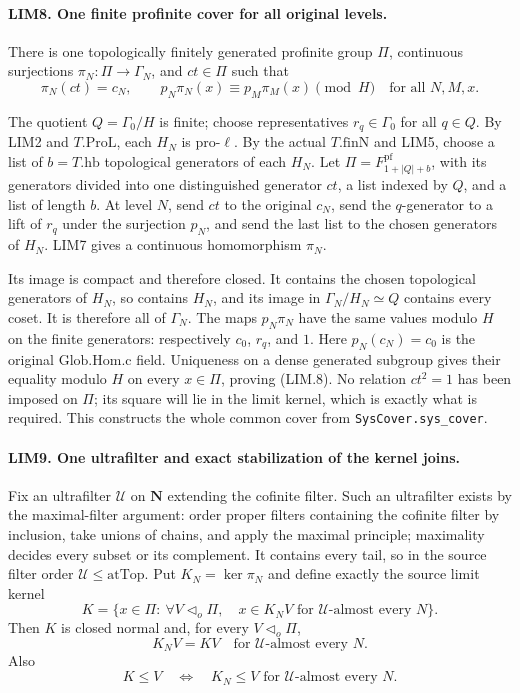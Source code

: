 \paragraph{LIM8. One finite profinite cover for all original levels.}
\label{claim:LIM8}
There is one topologically finitely generated profinite group \(\Pi\),
continuous surjections \(\pi_N:\Pi\to\Gamma_N\), and \(ct\in\Pi\)
such that
\[
 \pi_N(ct)=c_N,\qquad
 p_N\pi_N(x)\equiv p_M\pi_M(x)\pmod H
 \quad\text{for all }N,M,x.
 \tag{LIM.8}
\]

The quotient \(Q=\Gamma_0/H\) is finite; choose representatives
\(r_q\in\Gamma_0\) for all \(q\in Q\).
By LIM2 and \(T.\mathrm{ProL}\), each \(H_N\) is pro-\(\ell\).
By the actual \(T.\mathrm{finN}\) and LIM5, choose a list of
\(b=T.\mathrm{hb}\) topological generators of each \(H_N\).
Let \(\Pi=F_{1+|Q|+b}^{\mathrm{pf}}\), with its generators divided
into one distinguished generator \(ct\), a list indexed by \(Q\),
and a list of length \(b\).
At level \(N\), send \(ct\) to the original \(c_N\), send the
\(q\)-generator to a lift of \(r_q\) under the surjection \(p_N\),
and send the last list to the chosen generators of \(H_N\).
LIM7 gives a continuous homomorphism \(\pi_N\).

Its image is compact and therefore closed.  It contains the chosen
topological generators of \(H_N\), so contains \(H_N\), and its
image in \(\Gamma_N/H_N\simeq Q\) contains every coset.
It is therefore all of \(\Gamma_N\).
The maps \(p_N\pi_N\) have the same values modulo \(H\) on the
finite generators: respectively \(c_0\), \(r_q\), and \(1\).
Here \(p_N(c_N)=c_0\) is the original \(\mathrm{Glob.Hom.c}\) field.
Uniqueness on a dense generated subgroup gives their equality modulo
\(H\) on every \(x\in\Pi\), proving (LIM.8).
No relation \(ct^2=1\) has been imposed on \(\Pi\); its square
will lie in the limit kernel, which is exactly what is required.
This constructs the whole common cover from \texttt{SysCover.sys\_cover}.

\paragraph{LIM9. One ultrafilter and exact stabilization of the kernel joins.}
\label{claim:LIM9}
Fix an ultrafilter \(\mathcal U\) on \(\mathbf N\) extending the
cofinite filter.  Such an ultrafilter exists by the maximal-filter
argument: order proper filters containing the cofinite filter by
inclusion, take unions of chains, and apply the maximal principle;
maximality decides every subset or its complement.
It contains every tail, so in the source filter order
\(\mathcal U\le\mathrm{atTop}\).
Put \(K_N=\ker\pi_N\) and define exactly the source limit kernel
\[
 K=\{x\in\Pi:\ 
       \forall V\triangleleft_o\Pi,\quad
       x\in K_NV\text{ for }\mathcal U\text{-almost every }N\}.
 \tag{LIM.9}
\]
Then \(K\) is closed normal and, for every \(V\triangleleft_o\Pi\),
\[
 K_NV=KV\quad\text{for }\mathcal U\text{-almost every }N.
 \tag{LIM.10}
\]
Also
\[
 K\le V\quad\Longleftrightarrow\quad
 K_N\le V\text{ for }\mathcal U\text{-almost every }N.
 \tag{LIM.11}
\]

